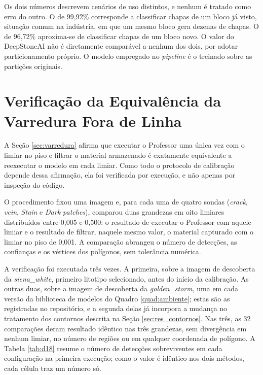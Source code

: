 Os dois números descrevem cenários de uso distintos, e nenhum é tratado como erro do outro. O de 99,92\% corresponde a classificar chapas de um bloco já visto, situação comum na indústria, em que um mesmo bloco gera dezenas de chapas. O de 96,72\% aproxima-se de classificar chapas de um bloco novo. O valor do DeepStoneAI não é diretamente comparável a nenhum dos dois, por adotar particionamento próprio. O modelo empregado no \textit{pipeline} é o treinado sobre as partições originais.

\section{Verificação da Equivalência da Varredura Fora de Linha}
\label{sec:res_d18}

A Seção \ref{sec:varredura} afirma que executar o Professor uma única vez com o limiar no piso e filtrar o material armazenado é exatamente equivalente a reexecutar o modelo em cada limiar. Como todo o protocolo de calibração depende dessa afirmação, ela foi verificada por execução, e não apenas por inspeção do código.

O procedimento fixou uma imagem e, para cada uma de quatro sondas (\textit{crack}, \textit{vein}, \textit{Stain} e \textit{Dark patches}), comparou duas grandezas em oito limiares distribuídos entre 0,005 e 0,500: o resultado de executar o Professor com aquele limiar e o resultado de filtrar, naquele mesmo valor, o material capturado com o limiar no piso de 0,001. A comparação abrangeu o número de detecções, as confianças e os vértices dos polígonos, sem tolerância numérica.

A verificação foi executada três vezes. A primeira, sobre a imagem de descoberta da \textit{siena\_white}, primeiro litotipo selecionado, antes do início da calibração. As outras duas, sobre a imagem de descoberta da \textit{golden\_storm}, uma em cada versão da biblioteca de modelos do Quadro \ref{quad:ambiente}; estas são as registradas no repositório, e a segunda delas já incorpora a mudança no tratamento dos contornos descrita na Seção \ref{sec:res_contornos}. Nas três, as 32 comparações deram resultado idêntico nas três grandezas, sem divergência em nenhum limiar, no número de regiões ou em qualquer coordenada de polígono. A Tabela \ref{tab:d18} resume o número de detecções sobreviventes em cada configuração na primeira execução; como o valor é idêntico nos dois métodos, cada célula traz um número só.

